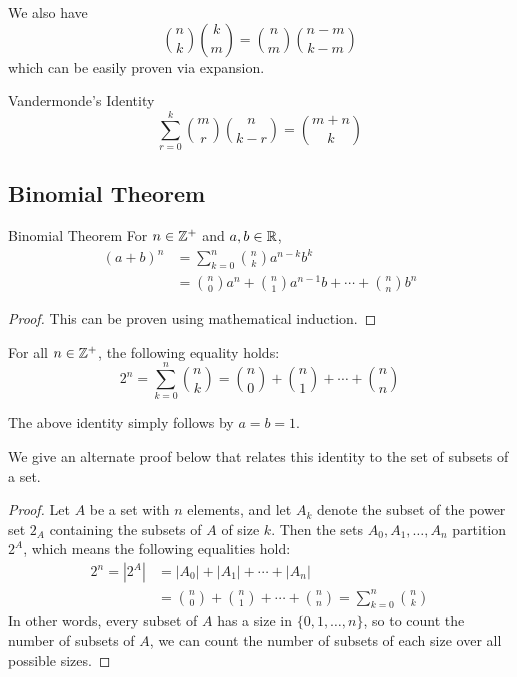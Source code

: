 We also have 
\begin{equation}
\binom{n}{k} \binom{k}{m} = \binom{n}{m} \binom{n-m}{k-m}
\end{equation}
which can be easily proven via expansion.

\begin{thrm}{Vandermonde's Identity}{}
\begin{equation}
\sum_{r=0}^{k} \binom{m}{r} \binom{n}{k-r} = \binom{m+n}{k}
\end{equation}
\end{thrm}

\subsection{Binomial Theorem}
\begin{thrm}{Binomial Theorem}{} 
For $n \in \mathbb Z^{+}$ and $a,b\in\mathbb R$, 
\begin{equation}
\begin{split}
(a+b)^n &= \sum_{k=0}^n\binom{n}{k}a^{n-k}b^k\\
&= \binom{n}{0}a^n + \binom{n}{1}a^{n-1}b + \cdots + \binom{n}{n}b^n
\end{split}
\end{equation}
\end{thrm}

\begin{proof}
This can be proven using mathematical induction.
\end{proof}

\begin{corollary}
For all $n\in\mathbb Z^{+}$, the following equality holds:
\begin{equation}
2^n = \sum_{k=0}^{n} \binom{n}{k} = \binom{n}{0}+\binom{n}{1}+\cdots+\binom{n}{n}
\end{equation}
\end{corollary}
\begin{remark}
The above identity simply follows by $a = b = 1$.
\end{remark}
We give an alternate proof below that relates this identity to the set of subsets of a set.
\begin{proof}
Let $A$ be a set with $n$ elements, and let $A_k$ denote the subset of the power set $2_A$ containing the subsets of $A$ of size $k$. Then the sets $A_0,A_1,\dots,A_n$ partition $2^A$, which means the following
equalities hold:
\begin{align*}
2^n=|2^A| &= |A_0|+|A_1|+\cdots+|A_n| \\
&= \binom{n}{0}+\binom{n}{1}+\cdots+\binom{n}{n} = \sum_{k=0}^{n} \binom{n}{k}
\end{align*}
In other words, every subset of $A$ has a size in $\{0,1,\dots,n\}$, so to count the number of subsets of $A$, we can count the number of subsets of each size over all possible sizes.
\end{proof}

